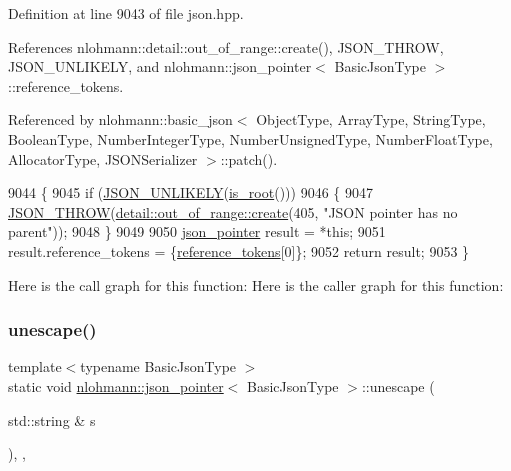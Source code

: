 Definition at line 9043 of file json.\+hpp.



References nlohmann\+::detail\+::out\+\_\+of\+\_\+range\+::create(), J\+S\+O\+N\+\_\+\+T\+H\+R\+OW, J\+S\+O\+N\+\_\+\+U\+N\+L\+I\+K\+E\+LY, and nlohmann\+::json\+\_\+pointer$<$ Basic\+Json\+Type $>$\+::reference\+\_\+tokens.



Referenced by nlohmann\+::basic\+\_\+json$<$ Object\+Type, Array\+Type, String\+Type, Boolean\+Type, Number\+Integer\+Type, Number\+Unsigned\+Type, Number\+Float\+Type, Allocator\+Type, J\+S\+O\+N\+Serializer $>$\+::patch().


\begin{DoxyCode}
9044     \{
9045         \textcolor{keywordflow}{if} (\hyperlink{json_8hpp_ab77582407c64944e7db1ea95ab520253}{JSON\_UNLIKELY}(\hyperlink{classnlohmann_1_1json__pointer_aa7cd421aaccabea7ffcf953f7ff96362}{is\_root}()))
9046         \{
9047             \hyperlink{json_8hpp_a6c274f6db2e65c1b66c7d41b06ad690f}{JSON\_THROW}(\hyperlink{classnlohmann_1_1detail_1_1out__of__range_a3f6d82a6f967c4728a1ec735a7867073}{detail::out\_of\_range::create}(405, \textcolor{stringliteral}{"JSON
       pointer has no parent"}));
9048         \}
9049 
9050         \hyperlink{classnlohmann_1_1json__pointer_a7f32d7c62841f0c4a6784cf741a6e4f8}{json\_pointer} result = *\textcolor{keyword}{this};
9051         result.reference\_tokens = \{\hyperlink{classnlohmann_1_1json__pointer_a07a990a6838de4f38ee9d881e7b9fd61}{reference\_tokens}[0]\};
9052         \textcolor{keywordflow}{return} result;
9053     \}
\end{DoxyCode}
Here is the call graph for this function\+:
Here is the caller graph for this function\+:
\mbox{\label{classnlohmann_1_1json__pointer_ab85442d5fbcc289b79beeefc2175446f}} 
\subsubsection{\texorpdfstring{unescape()}{unescape()}}
{\footnotesize\ttfamily template$<$typename Basic\+Json\+Type $>$ \\
static void \hyperlink{classnlohmann_1_1json__pointer}{nlohmann\+::json\+\_\+pointer}$<$ Basic\+Json\+Type $>$\+::unescape (\begin{DoxyParamCaption}\item[{std\+::string \&}]{s }\end{DoxyParamCaption})\hspace{0.3cm}{\ttfamily [inline]}, {\ttfamily [static]}, {\ttfamily [private]}}



